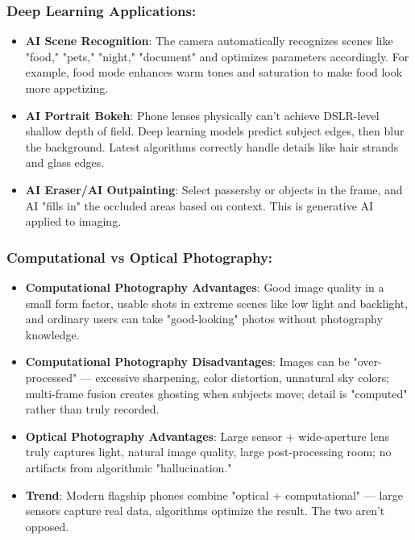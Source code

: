 \subsubsection*{Deep Learning Applications:}

\begin{itemize}
  \item \textbf{AI Scene Recognition}: The camera automatically recognizes scenes like "food," "pets," "night," "document" and optimizes parameters accordingly. For example, food mode enhances warm tones and saturation to make food look more appetizing.
  \item \textbf{AI Portrait Bokeh}: Phone lenses physically can't achieve DSLR-level shallow depth of field. Deep learning models predict subject edges, then blur the background. Latest algorithms correctly handle details like hair strands and glass edges.
  \item \textbf{AI Eraser/AI Outpainting}: Select passersby or objects in the frame, and AI "fills in" the occluded areas based on context. This is generative AI applied to imaging.
\end{itemize}

\subsubsection*{Computational vs Optical Photography:}

\begin{itemize}
  \item \textbf{Computational Photography Advantages}: Good image quality in a small form factor, usable shots in extreme scenes like low light and backlight, and ordinary users can take "good-looking" photos without photography knowledge.
  \item \textbf{Computational Photography Disadvantages}: Images can be "over-processed" — excessive sharpening, color distortion, unnatural sky colors; multi-frame fusion creates ghosting when subjects move; detail is "computed" rather than truly recorded.
  \item \textbf{Optical Photography Advantages}: Large sensor + wide-aperture lens truly captures light, natural image quality, large post-processing room; no artifacts from algorithmic "hallucination."
  \item \textbf{Trend}: Modern flagship phones combine "optical + computational" — large sensors capture real data, algorithms optimize the result. The two aren't opposed.
\end{itemize}

